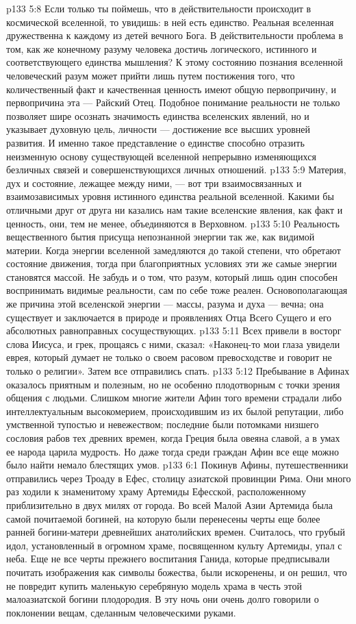 \vs p133 5:8 Если только ты поймешь, что в действительности происходит в космической вселенной, то увидишь: в ней есть единство. Реальная вселенная дружественна к каждому из детей вечного Бога. В действительности проблема в том, как же конечному разуму человека достичь логического, истинного и соответствующего единства мышления? К этому состоянию познания вселенной человеческий разум может прийти лишь путем постижения того, что количественный факт и качественная ценность имеют общую первопричину, и первопричина эта --- Райский Отец. Подобное понимание реальности не только позволяет шире осознать значимость единства вселенских явлений, но и указывает духовную цель, личности --- достижение все высших уровней развития. И именно такое представление о единстве способно отразить неизменную основу существующей вселенной непрерывно изменяющихся безличных связей и совершенствующихся личных отношений.
\vs p133 5:9 Материя, дух и состояние, лежащее между ними, --- вот три взаимосвязанных и взаимозависимых уровня истинного единства реальной вселенной. Какими бы отличными друг от друга ни казались нам такие вселенские явления, как факт и ценность, они, тем не менее, объединяются в Верховном.
\vs p133 5:10 Реальность вещественного бытия присуща непознанной энергии так же, как видимой материи. Когда энергии вселенной замедляются до такой степени, что обретают состояние движения, тогда при благоприятных условиях эти же самые энергии становятся массой. Не забудь и о том, что разум, который лишь один способен воспринимать видимые реальности, сам по себе тоже реален. Основополагающая же причина этой вселенской энергии --- массы, разума и духа --- вечна; она существует и заключается в природе и проявлениях Отца Всего Сущего и его абсолютных равноправных сосуществующих.
\vs p133 5:11 \pc Всех привели в восторг слова Иисуса, и грек, прощаясь с ними, сказал: «Наконец\hyp{}то мои глаза увидели еврея, который думает не только о своем расовом превосходстве и говорит не только о религии». Затем все отправились спать.
\vs p133 5:12 Пребывание в Афинах оказалось приятным и полезным, но не особенно плодотворным с точки зрения общения с людьми. Слишком многие жители Афин того времени страдали либо интеллектуальным высокомерием, происходившим из их былой репутации, либо умственной тупостью и невежеством; последние были потомками низшего сословия рабов тех древних времен, когда Греция была овеяна славой, а в умах ее народа царила мудрость. Но даже тогда среди граждан Афин все еще можно было найти немало блестящих умов.
\vs p133 6:1 Покинув Афины, путешественники отправились через Троаду в Ефес, столицу азиатской провинции Рима. Они много раз ходили к знаменитому храму Артемиды Ефесской, расположенному приблизительно в двух милях от города. Во всей Малой Азии Артемида была самой почитаемой богиней, на которую были перенесены черты еще более ранней богини\hyp{}матери древнейших анатолийских времен. Считалось, что грубый идол, установленный в огромном храме, посвященном культу Артемиды, упал с неба. Еще не все черты прежнего воспитания Ганида, которые предписывали почитать изображения как символы божества, были искоренены, и он решил, что не повредит купить маленькую серебряную модель храма в честь этой малоазиатской богини плодородия. В эту ночь они очень долго говорили о поклонении вещам, сделанным человеческими руками.
